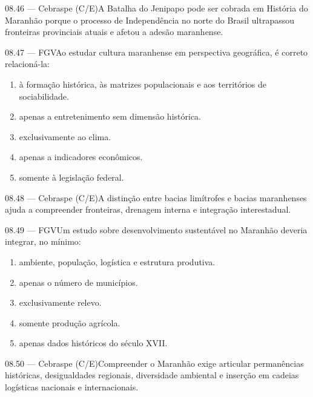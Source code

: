 \begin{questao}{ 08.46 — Cebraspe (C/E)}A Batalha do Jenipapo pode ser cobrada em História do Maranhão porque o processo de Independência no norte do Brasil ultrapassou fronteiras provinciais atuais e afetou a adesão maranhense.\end{questao}
\begin{questao}{ 08.47 — FGV}Ao estudar cultura maranhense em perspectiva geográfica, é correto relacioná-la:\begin{enumerate}[label=\Alph*)]\item à formação histórica, às matrizes populacionais e aos territórios de sociabilidade.\item apenas a entretenimento sem dimensão histórica.\item exclusivamente ao clima.\item apenas a indicadores econômicos.\item somente à legislação federal.\end{enumerate}\end{questao}
\begin{questao}{ 08.48 — Cebraspe (C/E)}A distinção entre bacias limítrofes e bacias maranhenses ajuda a compreender fronteiras, drenagem interna e integração interestadual.\end{questao}
\begin{questao}{ 08.49 — FGV}Um estudo sobre desenvolvimento sustentável no Maranhão deveria integrar, no mínimo:\begin{enumerate}[label=\Alph*)]\item ambiente, população, logística e estrutura produtiva.\item apenas o número de municípios.\item exclusivamente relevo.\item somente produção agrícola.\item apenas dados históricos do século XVII.\end{enumerate}\end{questao}
\begin{questao}{ 08.50 — Cebraspe (C/E)}Compreender o Maranhão exige articular permanências históricas, desigualdades regionais, diversidade ambiental e inserção em cadeias logísticas nacionais e internacionais.\end{questao}

